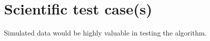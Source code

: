 \documentclass[a4paper, oneside, 11pt, article, english]{memoir}
\begin{document}
\section{Scientific test case(s)}
\label{sec:test-science}

Simulated data would be highly valuable in testing the algorithm. 


%
\end{document}
